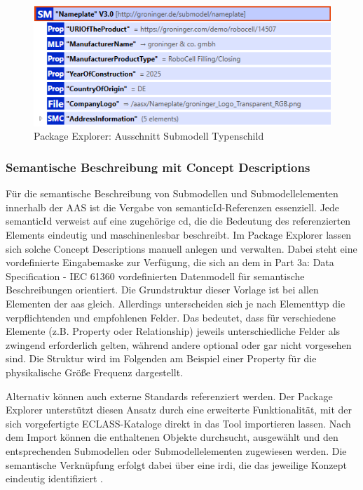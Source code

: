 \begin{figure}[htbp]
    \centering
    \includegraphics{Bilder/ModellierungAAS/Final/Submodell.PNG}
    \caption{Package Explorer: Ausschnitt Submodell Typenschild}
    \label{fig:SubmodellTypenschild}
\end{figure}

\subsubsection*{Semantische Beschreibung mit Concept Descriptions}

Für die semantische Beschreibung von Submodellen und Submodellelementen innerhalb der AAS ist die Vergabe von semanticId-Referenzen essenziell.
Jede semanticId verweist auf eine zugehörige \acs{cd}, die die Bedeutung des referenzierten Elements eindeutig und maschinenlesbar beschreibt.
Im Package Explorer lassen sich solche Concept Descriptions manuell anlegen und verwalten.
Dabei steht eine vordefinierte Eingabemaske zur Verfügung, die sich an dem in Part 3a: Data Specification - IEC 61360 \cite{SpezifikationPart3a} vordefinierten Datenmodell für semantische Beschreibungen orientiert.
Die Grundstruktur dieser Vorlage ist bei allen Elementen der \acs{aas} gleich.
Allerdings unterscheiden sich je nach Elementtyp die verpflichtenden und empfohlenen Felder.
Das bedeutet, dass für verschiedene Elemente (z.B. Property oder Relationship) jeweils unterschiedliche Felder als zwingend erforderlich gelten, während andere optional oder gar nicht vorgesehen sind.
Die Struktur wird im Folgenden am Beispiel einer Property für die physikalische Größe Frequenz dargestellt.



Alternativ können auch externe Standards referenziert werden. 
Der Package Explorer unterstützt diesen Ansatz durch eine erweiterte Funktionalität, mit der sich vorgefertigte ECLASS-Kataloge direkt in das Tool importieren lassen. 
Nach dem Import können die enthaltenen Objekte durchsucht, ausgewählt und den entsprechenden Submodellen oder Submodellelementen zugewiesen werden. 
Die semantische Verknüpfung erfolgt dabei über eine \acs{irdi}, die das jeweilige Konzept eindeutig identifiziert \cite{eclass_irdi}. 

